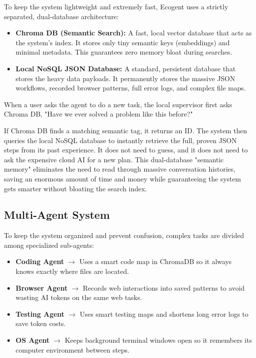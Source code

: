 To keep the system lightweight and extremely fast, Ecogent uses a strictly separated, dual-database architecture:
\begin{itemize}
    \item \textbf{Chroma DB (Semantic Search):} A fast, local vector database \cite{chromadb_docs} that acts as the system's index. It stores only tiny semantic keys (embeddings) and minimal metadata. This guarantees zero memory bloat during searches.
    \item \textbf{Local NoSQL JSON Database:} A standard, persistent database that stores the heavy data payloads. It permanently stores the massive JSON workflows, recorded browser patterns, full error logs, and complex file maps.
\end{itemize}

When a user asks the agent to do a new task, the local supervisor first asks Chroma DB, "Have we ever solved a problem like this before?" 

If Chroma DB finds a matching semantic tag, it returns an ID. The system then queries the local NoSQL database to instantly retrieve the full, proven JSON steps from its past experience. It does not need to guess, and it does not need to ask the expensive cloud AI for a new plan. This dual-database "semantic memory" eliminates the need to read through massive conversation histories, saving an enormous amount of time and money while guaranteeing the system gets smarter without bloating the search index.\\

\subsection{Multi-Agent System}
To keep the system organized and prevent confusion, complex tasks are divided among specialized sub-agents:
\begin{itemize}
    \item \textbf{Coding Agent} $\rightarrow$ Uses a smart code map in ChromaDB so it always knows exactly where files are located.
    \item \textbf{Browser Agent} $\rightarrow$ Records web interactions into saved patterns to avoid wasting AI tokens on the same web tasks.
    \item \textbf{Testing Agent} $\rightarrow$ Uses smart testing maps and shortens long error logs to save token costs.
    \item \textbf{OS Agent} $\rightarrow$ Keeps background terminal windows open so it remembers its computer environment between steps.
\end{itemize}


